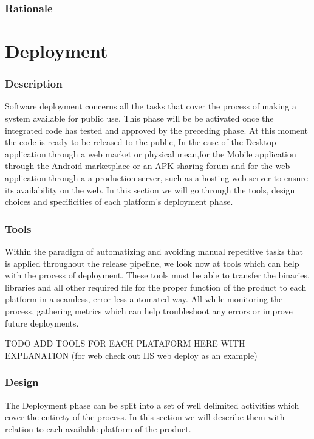 \documentclass[12pt]{report}
\begin{document}
\section{Rationale}
\part{Deployment}
\section{Description}
Software deployment concerns all the tasks that cover the process of making a system available for public use.
This phase will be be activated once the integrated code has tested and approved by the preceding
phase. At this moment the code is ready to be released to the public, In the case of the Desktop
application through a web market or physical mean,for the Mobile application through the Android
marketplace or an APK sharing forum and for the web application through a a production server, such
as a hosting web server to ensure its availability on the web. In this section we will go through
the tools, design choices and specificities of each platform's deployment phase.

\section{Tools}
Within the paradigm of automatizing and avoiding manual repetitive tasks that is applied throughout the release pipeline, we look now at tools which can help with the process of deployment. These tools must be able to transfer the binaries, libraries and all other required file for the proper function of the product to each platform in a seamless, error-less automated way. All while monitoring the process, gathering metrics which can help troubleshoot any errors or improve future deployments.

TODO ADD TOOLS FOR EACH PLATAFORM HERE WITH EXPLANATION (for web check out IIS web deploy as an example)

\section{Design}
The Deployment phase can be split into a set of well delimited activities which cover the entirety of the process. In this section we will describe them with relation to each available platform of the product.
\end{document}
